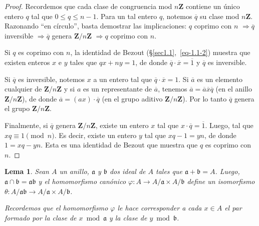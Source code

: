 \documentclass[oneside,bibtotoc,leqno,spanish]{amsbook}
\newcommand{\ZZ}{\mathbf{Z}}
\newcommand{\idl}[1]{\mathfrak{#1}}
\newcommand{\QED}{}%
\newcommand{\oline}[1]{\overline{#1}}
\newcommand{\then}{\ensuremath{\Rightarrow}\xspace}
\renewcommand{\to}[1][]{\xrightarrow{#1}}
\numberwithin{equation}{section}
\newenvironment{comm}%
	{\begin{trivlist}\item\small\itshape}
	{\end{trivlist}}
\theoremstyle{defi}
\theoremstyle{note}
\newtheorem{lemma}{Lema}
\theoremstyle{rem}
\numberwithin{theorem}{section}
\numberwithin{proposition}{section}
\numberwithin{definition}{section}
\numberwithin{lemma}{section}
\numberwithin{corollary}{section}
\numberwithin{example}{section}
\numberwithin{footnote}{section}%
\begin{document}
\begin{proof}
Recordemos que cada clase de congruencia mod $n\ZZ$ contiene un \'unico entero $q$ tal que
$0\leq q\leq n-1$. Para un tal entero $q$, notemos $\oline q$ su clase mod $n\ZZ$.
Razonando ``en c\'irculo'', basta demostrar las implicaciones: $q$ coprimo con $n$ \then $\oline q$ inversible
\then $\oline q$ genera $\ZZ/n\ZZ$ \then $q$ coprimo con $n$.

Si $q$ es coprimo con $n$, la
identidad de Bezout (\S\ref{sec1.1},~\eqref{eq-1.1-2}) muestra que existen enteros $x$ e $y$ tales que
$qx+ny = 1$, de donde $\oline q\cdot\oline x = \oline 1$ y $\oline q$ es inversible.

Si $\oline q$ es inversible, notemos $x$ a un entero tal que $\oline q\cdot\oline x = 1$.
Si $\oline a$ es un elemento cualquier de $\ZZ/n\ZZ$ y si $a$ es un representante de $\oline a$,
tenemos $\oline a = \oline a\oline x\oline q$ (en el anillo $\ZZ/n\ZZ$), de donde
$\oline a = (ax)\cdot\oline q$ (en el grupo aditivo $\ZZ/n\ZZ$). Por lo tanto $\oline q$
genera el grupo $\ZZ/n\ZZ$.

Finalmente, si $\oline q$ genera $\ZZ/n\ZZ$, existe un entero
$x$ tal que $x\cdot\oline q = \oline 1$. Luego, tal que $xq\equiv 1\pmod n$. Es decir,
existe un entero $y$ tal que $xq-1=yn$, de donde $1 = xq-yn$. Esta es una identidad de Bezout
que muestra que $q$ es coprimo con $n$.%
\end{proof}

\begin{lemma}\label{lem1.3.1}
Sean $A$ un anillo, $\idl{a}$ y $\idl{b}$ dos ideal de $A$ tales que $\idl{a}+\idl{b}=A$.
Luego, $\idl{a}\cap\idl{b} = \idl{a}\idl{b}$ y el homomorfismo can\'onico
$\varphi:A\to A/\idl{a}\times A/\idl{b}$ define un isomorfismo $\theta:A/\idl{a}\idl{b}\to A/\idl{a}\times
A/\idl{b}$.
\end{lemma}

\begin{comm}
Recordemos que el homomorfismo $\varphi$ le hace corresponder a cada $x\in A$ el par formado
por la clase de $x\bmod\idl{a}$ y la clase de $y\bmod\idl{b}$.
\end{comm}
\end{document}
